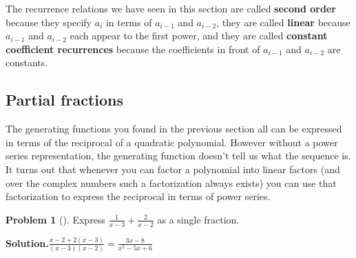 \documentclass[10pt,]{book}
\newcommand{\terminology}[1]{\textbf{#1}}
\theoremstyle{plain}
\theoremstyle{definition}
\newtheorem{activity}[project]{Problem}
\theoremstyle{definition}
\numberwithin{equation}{chapter}
\begin{document}
The recurrence relations we have seen in this section are called \terminology{second order} because they specify \(a_i\) in terms of \(a_{i-1}\) and \(a_{i-2}\), they are called \terminology{linear} because \(a_{i-1}\) and \(a_{i-2}\) each appear to the first power, and they are called \terminology{constant coefficient recurrences} because the coefficients in front of \(a_{i-1}\) and \(a_{i-2}\) are constants.%
\typeout{************************************************}
\typeout{************************************************}
\subsection[{Partial fractions}]{Partial fractions}\label{subsection-41}
The generating functions you found in the previous section all can be expressed in terms of the reciprocal of a quadratic polynomial. However without a power series representation, the generating function doesn't tell us what the sequence is. It turns out that whenever you can factor a polynomial into linear factors (and over the complex numbers such a factorization always exists) you can use that factorization to express the reciprocal in terms of power series.%
\begin{activity}[]\label{simplifysumoffractions}
Express \(\frac{1}{x-3} + \frac{2}{x-2}\) as a single fraction.%
\par\medskip\noindent%
\textbf{Solution.}\quad \(\frac{x-2 +2(x-3)}{(x-3)(x-2)}=\frac{3x-8}{x^2-5x+6}\)%
\end{activity}
\end{document}
